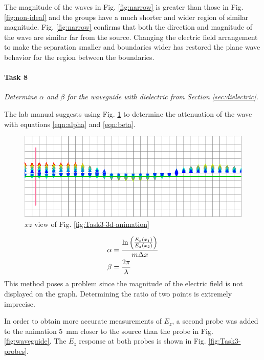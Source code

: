 The magnitude of the waves in Fig. \ref{fig:narrow} is greater than those in Fig. \ref{fig:non-ideal} and the groups have a much shorter and wider region of similar magnitude.
Fig. \ref{fig:narrow} confirms that both the direction and magnitude of the wave are similar far from the source.
Changing the electric field arrangement to make the separation smaller and boundaries wider has restored the plane wave behavior for the region between the boundaries.

\paragraph{Task 8} \textit{Determine $\alpha$ and $\beta$ for the waveguide with dielectric from Section \ref{sec:dielectric}.}

The lab manual suggests using Fig. \ref{fig:Task3-mesh} to determine the attenuation of the wave with equations \eqref{eqn:alpha} and \eqref{eqn:beta}.

\begin{figure}[tbph]
	\centering
	\includegraphics[width=0.7\linewidth]{graphics/Task3-mesh}
	\caption{$xz$ view of Fig. \ref{fig:Task3-3d-animation}}
	\label{fig:Task3-mesh}
\end{figure}
\begin{align}
	\alpha &= { \ln \left( { E_z(x_1) \over E_z(x_2) } \right) \over m \Delta x } \label{eqn:alpha} \\
	\beta &= { 2 \pi \over \lambda } \label{eqn:beta}
\end{align}
This method poses a problem since the magnitude of the electric field is not displayed on the graph.
Determining the ratio of two points is extremely imprecise.

In order to obtain more accurate measurements of $E_z$, a second probe was added to the animation \SI{5}{\milli\meter} closer to the source than the probe in Fig. \ref{fig:waveguide}.
The $E_z$ response at both probes is shown in Fig. \ref{fig:Task3-probes}. 

